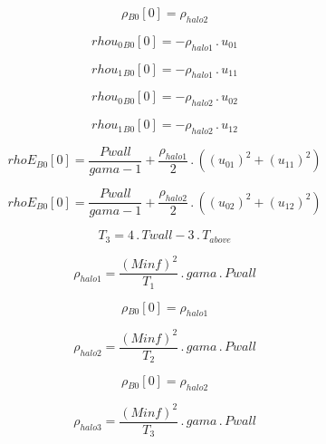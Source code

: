\documentclass{article}
\begin{document}
\begin{dmath}{\rho{_{B0}}}[{0}] = \rho_{halo 2}\end{dmath}

\begin{dmath}{rhou_{0}{_{B0}}}[{0}] = - \rho_{halo 1} \,.\, u_{01}\end{dmath}

\begin{dmath}{rhou_{1}{_{B0}}}[{0}] = - \rho_{halo 1} \,.\, u_{11}\end{dmath}

\begin{dmath}{rhou_{0}{_{B0}}}[{0}] = - \rho_{halo 2} \,.\, u_{02}\end{dmath}

\begin{dmath}{rhou_{1}{_{B0}}}[{0}] = - \rho_{halo 2} \,.\, u_{12}\end{dmath}

\begin{dmath}{rhoE{_{B0}}}[{0}] = \frac{Pwall}{gama - 1} + \frac{\rho_{halo 1}}{2} \,.\, \left(\left(u_{01} \right)^{2} + \left(u_{11} \right)^{2}\right)\end{dmath}

\begin{dmath}{rhoE{_{B0}}}[{0}] = \frac{Pwall}{gama - 1} + \frac{\rho_{halo 2}}{2} \,.\, \left(\left(u_{02} \right)^{2} + \left(u_{12} \right)^{2}\right)\end{dmath}

\begin{dmath}T_{3} = 4 \,.\, Twall - 3 \,.\, T_{above}\end{dmath}

\begin{dmath}\rho_{halo 1} = \frac{\left(Minf \right)^{2}}{T_{1}} \,.\, gama \,.\, Pwall\end{dmath}

\begin{dmath}{\rho{_{B0}}}[{0}] = \rho_{halo 1}\end{dmath}

\begin{dmath}\rho_{halo 2} = \frac{\left(Minf \right)^{2}}{T_{2}} \,.\, gama \,.\, Pwall\end{dmath}

\begin{dmath}{\rho{_{B0}}}[{0}] = \rho_{halo 2}\end{dmath}

\begin{dmath}\rho_{halo 3} = \frac{\left(Minf \right)^{2}}{T_{3}} \,.\, gama \,.\, Pwall\end{dmath}
\end{document}
